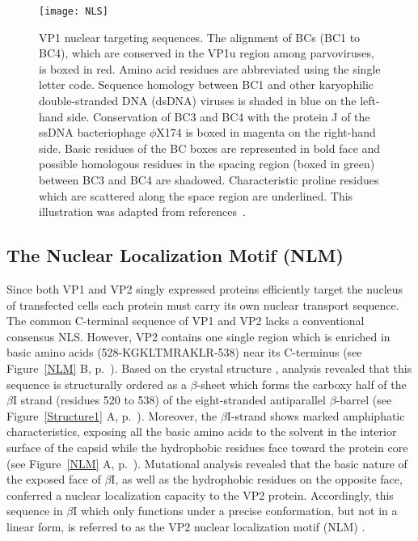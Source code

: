 \begin{figure}[H]
\centering
  \texttt{[image: NLS]} \\[0.5cm]
  \caption[Nuclear Localization Signal (NLS)]
   {VP1 nuclear targeting sequences. The alignment of BCs (BC1 to BC4), which are conserved in the VP1u region among parvoviruses, is boxed in red. Amino acid residues are abbreviated using the single letter code. Sequence homology between BC1 and other karyophilic double-stranded DNA (dsDNA) viruses is shaded in blue on the left-hand side. Conservation of BC3 and BC4 with the protein J of the ssDNA bacteriophage $\phi$X174 is boxed in magenta on the right-hand side. Basic residues of the BC boxes are represented in bold face and possible homologous residues in the spacing region (boxed in green) between BC3 and BC4 are shadowed. Characteristic proline residues which are scattered along the space region are underlined. This illustration was adapted from references~\cite{pmid12072505, almendral}.}
\label{NLS}
\end{figure}


\subsection{The Nuclear Localization Motif (NLM)}
\label{NLM1}
Since both VP1 and VP2 singly expressed proteins efficiently target the nucleus of transfected cells \cite{pmid8416366, pmid12072505} each protein must carry its own nuclear transport sequence. The common C-terminal sequence of VP1 and VP2 lacks a conventional consensus NLS. However, VP2 contains one single region which is enriched in basic amino acids (528-KGKLTMRAKLR-538) near its C-terminus (see Figure~\ref{NLM} B, p.~\pageref{NLM}). Based on the crystal structure \cite{pmid9817841, pmid2006420}, analysis revealed that this sequence is structurally ordered as a $\beta$-sheet which forms the carboxy half of the $\beta$I strand (residues 520 to 538) of the eight-stranded antiparallel $\beta$-barrel (see Figure~\ref{Structure1} A, p.~\pageref{Structure1}). Moreover, the $\beta$I-strand shows marked amphiphatic characteristics, exposing all the basic amino acids to the solvent in the interior surface of the capsid while the hydrophobic residues face toward the protein core (see Figure~\ref{NLM} A, p.~\pageref{NLM}). Mutational analysis revealed that the basic nature of the exposed face of $\beta$I, as well as the hydrophobic residues on the opposite face, conferred a nuclear localization capacity to the VP2 protein. Accordingly, this sequence in $\beta$I which only functions under a precise conformation, but not in a linear form, is referred to as the VP2 nuclear localization motif (NLM) \cite{pmid10729155}.        

